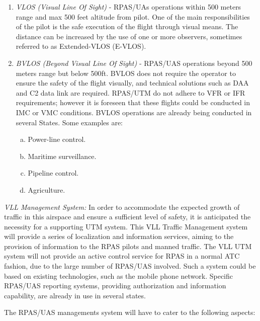 \begin{enumerate}
    \item \emph{VLOS (Visual Line Of Sight)} - RPAS/UAs operations within 500 meters range and max 500 feet  altitude from pilot. One of the main responsibilities of the pilot is the safe execution of the flight through visual means. The distance can be increased by the use of one or more observers, sometimes referred to as Extended-VLOS (E-VLOS).
    
    \item \emph{BVLOS (Beyond Visual Line Of Sight)} -  RPAS/UAS operations beyond 500 meters range but below 500ft. BVLOS does not require the operator to ensure the safety of the flight visually, and technical solutions such as DAA and C2 data link are required. RPAS/UTM do not adhere to VFR or IFR requirements; however it is foreseen that these flights could be conducted in IMC or VMC conditions. BVLOS operations are already being conducted in several States. Some examples are:
    
    \begin{enumerate}[a.]
        \item Power-line control.
        
        \item Maritime surveillance.
        
        \item Pipeline control.
        
        \item  Agriculture.
    \end{enumerate}
\end{enumerate}

\noindent\emph{VLL Management System:} In order to accommodate the expected growth of traffic in this airspace and ensure a sufficient level of safety, it is anticipated the necessity for a supporting UTM system. This VLL Traffic Management system will provide a series of localization and information services, aiming to the provision of information to the RPAS pilots and manned traffic. The VLL UTM system will not provide an active control service for RPAS in a normal ATC fashion, due to the large number of RPAS/UAS involved. Such a system could be based on existing technologies, such as the mobile phone network. Specific RPAS/UAS reporting systems, providing authorization and information capability, are already in use in several states.

The RPAS/UAS managements system will have to cater to the following aspects:

